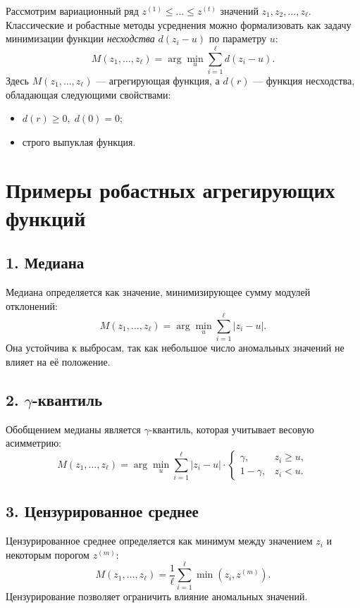 Рассмотрим вариационный ряд $z^{(1)} \leq ... \leq z^{(t)}$ значений $z_1, z_2, \dots, z_\ell$. Классические и робастные методы усреднения можно формализовать как задачу минимизации функции \textit{несходства} $d(z_i - u)$ по параметру $u$:
\begin{equation}
    M(z_1, \dots, z_\ell) = \arg \min_u \sum_{i=1}^\ell d(z_i - u).
\end{equation}
Здесь $M(z_1, \dots, z_\ell)$ — агрегирующая функция, а $d(r)$ — функция несходства, обладающая следующими свойствами:
\begin{itemize}
    \item $d(r) \geq 0, \; d(0) = 0$;
    \item строго выпуклая функция.
\end{itemize}

\section*{Примеры робастных агрегирующих функций}
\subsection*{1. Медиана}
Медиана определяется как значение, минимизирующее сумму модулей отклонений:
\begin{equation}
    M(z_1, \dots, z_\ell) = \arg \min_u \sum_{i=1}^\ell |z_i - u|.
\end{equation}
Она устойчива к выбросам, так как небольшое число аномальных значений не влияет на её положение.

\subsection*{2. $\gamma$-квантиль}
Обобщением медианы является $\gamma$-квантиль, которая учитывает весовую асимметрию:
\begin{equation}
    M(z_1, \dots, z_\ell) = \arg \min_u \sum_{i=1}^\ell |z_i - u| \cdot \begin{cases}
        \gamma,     & z_i \geq u, \\
        1 - \gamma, & z_i < u.
    \end{cases}
\end{equation}

\subsection*{3. Цензурированное среднее}
Цензурированное среднее определяется как минимум между значением $z_i$ и некоторым порогом $z^{(m)}$:
\begin{equation}
    M(z_1, \dots, z_\ell) = \frac{1}{\ell} \sum_{i=1}^\ell \min(z_i, z^{(m)}).
\end{equation}
Цензурирование позволяет ограничить влияние аномальных значений.

